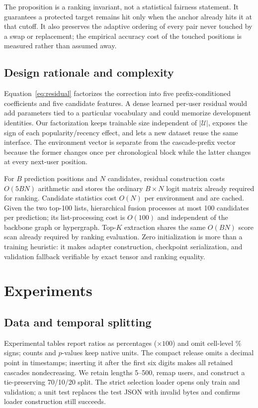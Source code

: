 \documentclass[sigconf,anonymous,review]{acmart}
\begin{document}
The proposition is a ranking invariant, not a statistical fairness statement. It guarantees a protected target remains hit only when the anchor already hits it at that cutoff. It also preserves the adaptive ordering of every pair never touched by a swap or replacement; the empirical accuracy cost of the touched positions is measured rather than assumed away.

\subsection{Design rationale and complexity}
Equation~\ref{eq:residual} factorizes the correction into five prefix-conditioned coefficients and five candidate features. A dense learned per-user residual would add parameters tied to a particular vocabulary and could memorize development identities. Our factorization keeps trainable size independent of $|\mathcal U|$, exposes the sign of each popularity/recency effect, and lets a new dataset reuse the same interface. The environment vector is separate from the cascade-prefix vector because the former changes once per chronological block while the latter changes at every next-user position.

For $B$ prediction positions and $N$ candidates, residual construction costs $O(5BN)$ arithmetic and stores the ordinary $B\times N$ logit matrix already required for ranking. Candidate statistics cost $O(N)$ per environment and are cached. Given the two top-100 lists, hierarchical fusion processes at most 100 candidates per prediction; its list-processing cost is $O(100)$ and independent of the backbone graph or hypergraph. Top-$K$ extraction shares the same $O(BN)$ score scan already required by ranking evaluation. Zero initialization is more than a training heuristic: it makes adapter construction, checkpoint serialization, and validation fallback verifiable by exact tensor and ranking equality.

\section{Experiments}
\subsection{Data and temporal splitting}
Experimental tables report ratios as percentages ($\times100$) and omit cell-level \% signs; counts and $p$-values keep native units. The compact release omits a decimal point in timestamps; inserting it after the first six digits makes all retained cascades nondecreasing. We retain lengths 5--500, remap users, and construct a tie-preserving 70/10/20 split. The strict selection loader opens only train and validation; a unit test replaces the test JSON with invalid bytes and confirms loader construction still succeeds.
\end{document}
